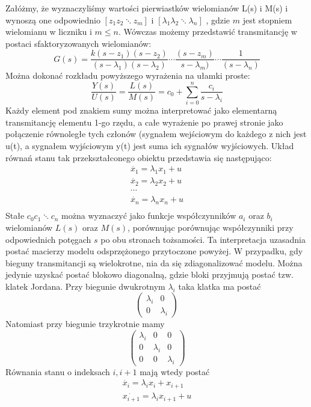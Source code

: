 \documentclass{article}
\begin{document}
			Załóżmy, że wyznaczyliśmy wartości pierwiastków wielomianów L(s) i M(s) i wynoszą
			one odpowiednio  $[z_1 z_2 \ddots z_m ]$ i $[\lambda_1 \lambda_2 \ddots \lambda_n ]$
			, gdzie $m$ jest stopniem wielomianu w
			liczniku i $m \leq n$. Wówczas możemy przedstawić transmitancję w postaci
			sfaktoryzowanych wielomianów:
			\begin{equation}
				G(s) = \frac{k(s-z_1)(s-z_2)}{(s-\lambda_1)(s-\lambda_2)}\cdots\frac{(s-z_m)}{s-\lambda_m)}\cdots\frac{1}{(s-\lambda_n)}
			\end{equation}
			Można dokonać rozkładu powyższego wyrażenia na ułamki proste:
			\begin{equation}
				\frac{Y(s)}{U(s)} = \frac{L(s)}{M(s)} = c_0 + \sum^n_{i=0}\frac{c_i}{s-\lambda_i}
			\end{equation}
			Każdy element pod znakiem sumy można interpretować jako elementarną transmitancję
			elementu 1-go rzędu, a całe wyrażenie po prawej stronie jako połączenie równoległe tych
			członów (sygnałem wejściowym do każdego z nich jest u(t), a sygnałem wyjściowym y(t)
			jest suma ich sygnałów wyjściowych. Układ równań stanu tak przekształconego obiektu
			przedstawia się następująco:
			\begin{align*}
				\dot{x_1} = \lambda_1 x_1 + u \\
				\dot{x_2} = \lambda_2 x_2 + u \\
				\cdots \\
				\dot{x_n} = \lambda_n x_n + u \\
			\end{align*}
			Stałe $c_0 c_1 \ddots c_n$ można wyznaczyć jako funkcje współczynników $a_i$
			oraz $b_i$ wielomianów $L(s)$ oraz $M(s)$, porównując porównując współczynniki
			przy odpowiednich potęgach $s$ po obu stronach tożsamości.
			Ta interpretacja uzasadnia postać macierzy modelu odsprzężonego przytoczone powyżej.
			W przypadku, gdy bieguny transmitancji są wielokrotne,
			nia da się zdiagonalizować modelu. Można jedynie uzyskać postać blokowo diagonalną,
			gdzie bloki przyjmują postać tzw. klatek Jordana.
			Przy biegunie dwukrotnym $\lambda_i$ taka klatka ma postać 
			\begin{equation}
				\begin{pmatrix}
					\lambda_i & 0 \\
					0 & \lambda_i
				\end{pmatrix}
			\end{equation}
			Natomiast przy biegunie trzykrotnie mamy
			\begin{equation}
				\begin{pmatrix}
					\lambda_i & 0 & 0 \\
					0 & \lambda_i & 0 \\
					0 & 0 & \lambda_i
				\end{pmatrix}
			\end{equation}
			Równania stanu o indeksach $i, i+1$ mają wtedy postać
			\begin{align*}
				\dot{x_i} = \lambda_ix_i + x_{i+1} \\ 
				\dot{x_{i+1}} = \lambda_ix_{i+1} + u
			\end{align*}
\end{document}
